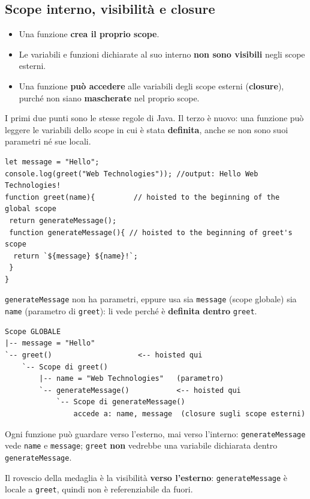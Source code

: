 \documentclass[10pt,a4paper]{article}
\begin{document}
\subsection{Scope interno, visibilità e closure}

\begin{itemize}
  \item Una funzione \textbf{crea il proprio scope}.
  \item Le variabili e funzioni dichiarate al suo interno \textbf{non sono visibili} negli scope esterni.
  \item Una funzione \textbf{può accedere} alle variabili degli scope esterni (\textbf{closure}), purché non siano \textbf{mascherate} nel proprio scope.
\end{itemize}

I primi due punti sono le stesse regole di Java. Il terzo è nuovo: una funzione può leggere le variabili dello scope in cui è stata \textbf{definita}, anche se non sono suoi parametri né sue locali.

\begin{lstlisting}[style=js]
let message = "Hello";
console.log(greet("Web Technologies")); //output: Hello Web Technologies!
function greet(name){         // hoisted to the beginning of the global scope
 return generateMessage();
 function generateMessage(){ // hoisted to the beginning of greet's scope
  return `${message} ${name}!`;
 }
}
\end{lstlisting}

\texttt{generateMessage} non ha parametri, eppure usa sia \texttt{message} (scope globale) sia \texttt{name} (parametro di \texttt{greet}): li vede perché è \textbf{definita dentro} \texttt{greet}.

\begin{lstlisting}[style=plain]
Scope GLOBALE
|-- message = "Hello"
`-- greet()                    <-- hoisted qui
    `-- Scope di greet()
        |-- name = "Web Technologies"   (parametro)
        `-- generateMessage()           <-- hoisted qui
            `-- Scope di generateMessage()
                accede a: name, message  (closure sugli scope esterni)
\end{lstlisting}

Ogni funzione può guardare verso l'esterno, mai verso l'interno: \texttt{generateMessage} vede \texttt{name} e \texttt{message}; \texttt{greet} \textbf{non} vedrebbe una variabile dichiarata dentro \texttt{generateMessage}.

Il rovescio della medaglia è la visibilità \textbf{verso l'esterno}: \texttt{generateMessage} è locale a \texttt{greet}, quindi non è referenziabile da fuori.
\end{document}
